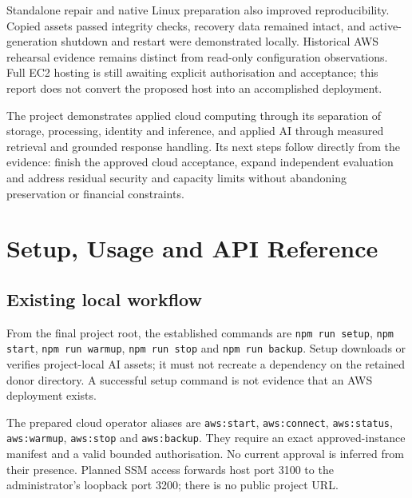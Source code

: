 \documentclass[11pt,a4paper,oneside]{report}
\renewcommand{\arraystretch}{1.18}
\begin{document}
Standalone repair and native Linux preparation also improved reproducibility. Copied assets passed integrity checks, recovery data remained intact, and active-generation shutdown and restart were demonstrated locally. Historical AWS rehearsal evidence remains distinct from read-only configuration observations. Full EC2 hosting is still awaiting explicit authorisation and acceptance; this report does not convert the proposed host into an accomplished deployment.

The project demonstrates applied cloud computing through its separation of storage, processing, identity and inference, and applied AI through measured retrieval and grounded response handling. Its next steps follow directly from the evidence: finish the approved cloud acceptance, expand independent evaluation and address residual security and capacity limits without abandoning preservation or financial constraints.
\FloatBarrier


\appendix\small{}\renewcommand{\arraystretch}{1.06}\setlength{\LTpre}{4pt}\setlength{\LTpost}{6pt}%
\chapter{Setup, Usage and API Reference}
\label{app:usage}
\section{Existing local workflow}
From the final project root, the established commands are \texttt{npm run setup}, \texttt{npm start}, \texttt{npm run warmup}, \texttt{npm run stop} and \texttt{npm run backup}. Setup downloads or verifies project-local AI assets; it must not recreate a dependency on the retained donor directory. A successful setup command is not evidence that an AWS deployment exists.

The prepared cloud operator aliases are \texttt{aws:start}, \texttt{aws:connect}, \texttt{aws:status}, \texttt{aws:warmup}, \texttt{aws:stop} and \texttt{aws:backup}. They require an exact approved-instance manifest and a valid bounded authorisation. No current approval is inferred from their presence. Planned SSM access forwards host port 3100 to the administrator's loopback port 3200; there is no public project URL.
\end{document}

